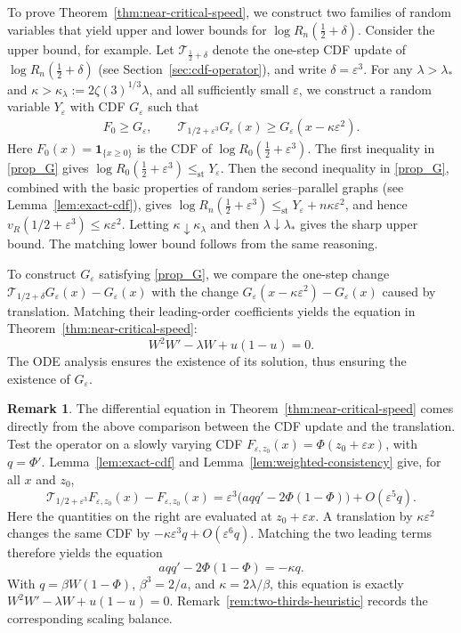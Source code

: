 \documentclass[a4paper,fleqn]{cas-sc}
\newif\ifshowrevisions
\DeclareRobustCommand{\rev}[1]{{\ifshowrevisions\color{blue}\fi#1}}
\numberwithin{equation}{section}
\theoremstyle{plain}
\theoremstyle{definition}
\newtheorem{remark}[theorem]{Remark}
\newcommand{\stle}{\le_{\mathrm{st}}}
\begin{document}
\rev{To prove Theorem~\ref{thm:near-critical-speed}, we construct two families of random variables that yield upper and lower bounds for $\log R_n(\frac12+\delta)$. Consider the upper bound, for example. Let $\mathcal T_{\frac12+\delta}$ denote the one-step CDF
update of $\log R_n(\frac12+\delta)$ (see Section~\ref{sec:cdf-operator}), and write $\delta=\varepsilon^3$.} For any
\(\lambda>\lambda_*\) and
\(\kappa>\kappa_\lambda:=2\zeta(3)^{1/3}\lambda\), and all sufficiently
small \(\varepsilon\), we construct \rev{a} random variable
\(Y_\varepsilon\) with CDF \(G_\varepsilon\)\rev{ such that}
\begin{align}\label{prop_G}
 F_0\ge G_\varepsilon,
 \qquad
 \mathcal T_{1/2+\varepsilon^3}G_\varepsilon(x)
 \ge G_\varepsilon(x-\kappa\varepsilon^2).
\end{align}
\rev{Here $F_0(x)=\mathbf 1_{\{x\ge0\}}$ is the CDF of $\log R_0(\frac12+\varepsilon^3)$. The first inequality in \eqref{prop_G} gives $\log R_0(\frac12+\varepsilon^3)
 \stle Y_\varepsilon$. Then the second inequality in \eqref{prop_G}, combined with the basic properties of random series--parallel graphs (see Lemma~\ref{lem:exact-cdf}), gives
  $\log R_n(\frac12+\varepsilon^3)
 \stle Y_\varepsilon+n\kappa\varepsilon^2$, and hence}
\(v_R(1/2+\varepsilon^3)\le\kappa\varepsilon^2\).
Letting \(\kappa\downarrow\kappa_\lambda\) and then
\(\lambda\downarrow\lambda_*\) gives the sharp upper bound. The matching
lower bound follows from the same reasoning.

To construct \(G_\varepsilon\) satisfying \eqref{prop_G}, we compare the  one-step change
\(\mathcal T_{1/2+\delta}G_\varepsilon(x)-G_\varepsilon(x)\) with the change
\(G_\varepsilon(x-\kappa\varepsilon^2)-G_\varepsilon(x)\) caused by translation.
 \rev{Matching their leading-order coefficients yields the}
equation in Theorem~\ref{thm:near-critical-speed}:
\[
 W^2W'-\lambda W+u(1-u)=0.
\]
The ODE analysis
ensures the existence of its solution, thus ensuring the existence of $G_\varepsilon$.



\begin{remark}
    The differential equation in Theorem~\ref{thm:near-critical-speed} comes
\rev{directly from the above comparison between the CDF update and the translation.} Test the operator on a slowly varying CDF
$F_{\varepsilon,z_0}(x)=\Phi(z_0+\varepsilon x)$, with
$q=\Phi'$.  Lemma~\ref{lem:exact-cdf} and
Lemma~\ref{lem:weighted-consistency} give, for all $x$ and $z_0$,
\[
 \mathcal T_{1/2+\varepsilon^3}F_{\varepsilon,z_0}(x)
 -F_{\varepsilon,z_0}(x)
 =\varepsilon^3\bigl(a q q'-2\Phi(1-\Phi)\bigr)
  +O(\varepsilon^5q).
\]
Here the quantities on the right are evaluated at
$z_0+\varepsilon x$.
A translation by $\kappa\varepsilon^2$ changes the same CDF by
$-\kappa\varepsilon^3q+O(\varepsilon^6q)$.  Matching the two leading terms
therefore yields the  equation
\[
 a q q'-2\Phi(1-\Phi)=-\kappa q.
\]
With $q=\beta W(1-\Phi)$, $\beta^3=2/a$, and
$\kappa=2\lambda/\beta$, this equation is exactly
$W^2W'-\lambda W+u(1-u)=0$.   Remark~\ref{rem:two-thirds-heuristic} records the corresponding
scaling balance.

\end{remark}
\end{document}
